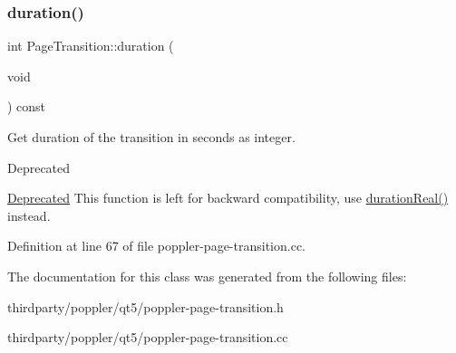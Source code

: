 \subsubsection{\texorpdfstring{duration()}{duration()}}
{\footnotesize\ttfamily int Page\+Transition\+::duration (\begin{DoxyParamCaption}\item[{void}]{ }\end{DoxyParamCaption}) const}



Get duration of the transition in seconds as integer. 

\begin{DoxyRefDesc}{Deprecated}
\item[\hyperlink{deprecated__deprecated000002}{Deprecated}]This function is left for backward compatibility, use \hyperlink{class_poppler_1_1_page_transition_a1417568e2888dbdfa5047f4277dfaefe}{duration\+Real()} instead. \end{DoxyRefDesc}


Definition at line 67 of file poppler-\/page-\/transition.\+cc.



The documentation for this class was generated from the following files\+:\begin{DoxyCompactItemize}
\item 
thirdparty/poppler/qt5/poppler-\/page-\/transition.\+h\item 
thirdparty/poppler/qt5/poppler-\/page-\/transition.\+cc\end{DoxyCompactItemize}
